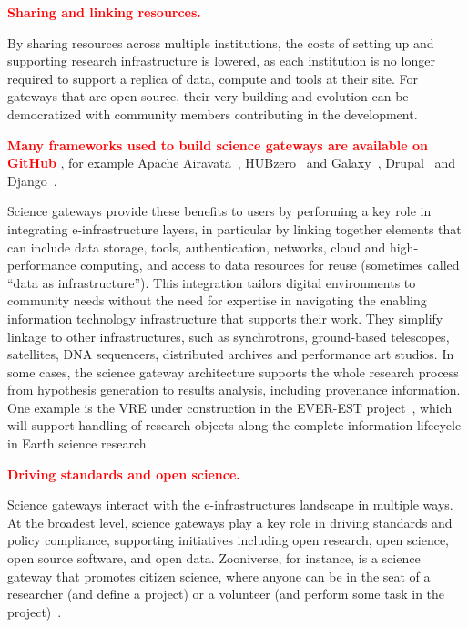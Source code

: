 \documentclass[review]{elsarticle}
\newcommand{\changedtext}[1]{
	\textcolor{red}{\textbf{#1}}
}
\begin{document}
\changedtext{\textbf{Sharing and linking resources.} }
By sharing resources across multiple institutions, the costs of setting up and supporting research infrastructure is lowered, as each institution is no longer required to support a replica of data, compute and tools at their site. For gateways that are open source, their very building and evolution can be democratized with community members contributing in the development. 
\changedtext{Many frameworks used to build  science gateways are available on GitHub}, for example Apache Airavata~\cite{airavata}, HUBzero~\cite{hubzero-55} and  Galaxy~\cite{galaxy}, Drupal~\cite{drupal} and Django~\cite{django}.

Science gateways provide these benefits to users by performing a key role in integrating e-infrastructure layers, in particular by linking together elements that can include data storage, tools, authentication, networks, cloud and high-performance computing, and access to data resources for reuse (sometimes called ``data as infrastructure''). This integration tailors digital environments to community needs without the need for expertise in navigating the enabling information technology infrastructure that supports their work. They simplify linkage to other infrastructures, such as synchrotrons, ground-based telescopes, satellites, DNA sequencers, distributed archives and performance art studios. In some cases, the science gateway architecture supports the whole research process from hypothesis generation to results analysis, including provenance information. One example is the VRE under construction in the EVER-EST project~\cite{everest-73}, which will support handling of research objects along the complete information lifecycle in Earth science research. 

\changedtext{\textbf{Driving standards and open science.}}
Science gateways interact with the e-infrastructures landscape in multiple ways. At the broadest level, science gateways play a key role in driving standards and policy compliance, supporting initiatives including open research, open science, open source software, and open data.  Zooniverse, for instance, is a science gateway that promotes  citizen science, where anyone can be in the seat of a researcher (and define a project) or a volunteer (and perform some task in the project)~\cite{zoo-76}. 
\end{document}
